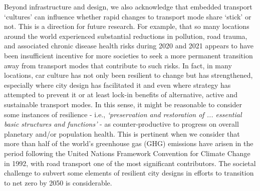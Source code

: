 \documentclass[preprint,10pt]{elsarticle} %
\begin{document}
Beyond infrastructure and design, we also acknowledge that embedded transport `cultures' \cite{PATERSON_2000} can influence whether rapid changes to transport mode share `stick' or not. This is a direction for future research. For example, that so many locations around the world experienced substantial reductions in pollution, road trauma, and associated chronic disease health risks during 2020 and 2021 appears to have been insufficient incentive for more societies to seek a more permanent transition away from transport modes that contribute to such risks. In fact, in many locations, car culture has not only been resilient to change but has strengthened, especially where city design has facilitated it and even where strategy has attempted to prevent it or at least lock-in benefits of alternative, active and sustainable transport modes\cite{hunter_city_2024}. In this sense, it might be reasonable to consider some instances of resilience - i.e., \textit{`preservation and restoration of ... essential basic structures and functions'} - as counter-productive to progress on overall planetary and/or population health. This is pertinent when we consider that more than half of the world's greenhouse gas (GHG) emissions have arisen in the period following the United Nations Framework Convention for Climate Change in 1992\cite{bashmakov2022climate}, with road transport one of the most significant contributors. The societal challenge to subvert some elements of resilient city designs in efforts to transition to net zero by 2050\cite{lynskey2020moving} is considerable.
\end{document}

